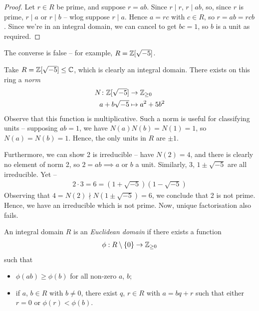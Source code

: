 \documentclass{../template/note}
\begin{document}
    \begin{proof}
        Let $r \in R$ be prime, and suppose $r=ab$. Since $r \mid r$, $r \mid ab$, so, since $r$ is prime, $r \mid a$ or $r \mid b$ -- wlog suppose $r \mid a$. Hence $a = rc$ with $c \in R$, so $r = ab = rcb$. Since we're in an integral domain, we can cancel to get $bc = 1$, so $b$ is a unit as required.
    \end{proof}
    
    \begin{remark*}
        The converse is false -- for example, $R = \mathbb Z[\sqrt{-5}]$.
    \end{remark*}


    \begin{example*}
        Take $R = \mathbb Z[\sqrt{-5}] \leq \mathbb C$, which is clearly an integral domain. There exists on this ring a \emph{norm}
        \begin{align*}
            N\colon \mathbb Z[\sqrt{-5}] &\to \mathbb Z_{\geq 0} \\
            a + b\sqrt{-5} &\mapsto a^2 + 5b^2
        \end{align*}
        Observe that this function is multiplicative. Such a norm is useful for classifying units -- supposing $ab = 1$, we have $N(a)N(b) = N(1) = 1$, so $N(a) = N(b) = 1$. Hence, the only units in $R$ are $\pm 1$.
        
        Furthermore, we can show 2 is irreducible -- have $N(2) = 4$, and there is clearly no element of norm 2, so $2 = ab \implies a$ or $b$ a unit. Similarly, 3, $1 \pm \sqrt{-5}$ are all irreducible. Yet --
        \begin{align*}
            2 \cdot 3 = 6 = (1 + \sqrt{-5})(1 - \sqrt{-5})
        \end{align*}
        Observing that $4 = N(2) \nmid N(1 \pm \sqrt{-5}) = 6$, we conclude that 2 is not prime. Hence, we have an irreducible which is not prime. Now, unique factorisation also fails.
    \end{example*}

    \begin{definition}
        An integral domain $R$ is an \emph{Euclidean domain} if there exists a function
        \begin{align*}
            \phi: R \setminus \{0\} \to \mathbb Z_{\geq 0}
        \end{align*}
        such that
        \begin{itemize}
            \item $\phi(ab) \geq \phi(b)$ for all non-zero $a$, $b$;
            \item if $a$, $b \in R$ with $b \neq 0$, there exist $q$, $r \in R$ with $a = bq + r$ such that either $r = 0$ or $\phi(r) < \phi(b)$.
        \end{itemize}       
    \end{definition}
    
\end{document}

